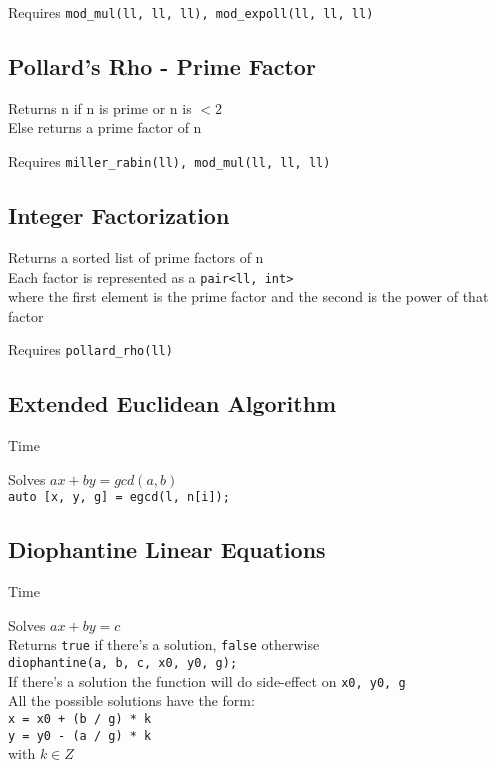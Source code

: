 Requires \verb|mod_mul(ll, ll, ll), mod_expoll(ll, ll, ll)|


\subsection{Pollard's Rho - Prime Factor}
Returns n if n is prime or n is $< 2$ \\
Else returns a prime factor of n

Requires \verb|miller_rabin(ll), mod_mul(ll, ll, ll)|


\subsection{Integer Factorization}
Returns a sorted list of prime factors of n \\
Each factor is represented as a \verb|pair<ll, int>| \\
where the first element is the prime factor and the second is the power of that factor

Requires \verb|pollard_rho(ll)|


\subsection{Extended Euclidean Algorithm}
 Time

Solves $ax + by = gcd(a, b)$ \\
\verb|auto [x, y, g] = egcd(l, n[i]);|


\subsection{Diophantine Linear Equations}
 Time

Solves $ax + by = c$ \\
Returns \verb|true| if there's a solution, \verb|false| otherwise \\
\verb|diophantine(a, b, c, x0, y0, g);| \\
If there's a solution the function will do side-effect on \verb|x0, y0, g|\\
All the possible solutions have the form: \\
\verb|x = x0 + (b / g) * k| \\
\verb|y = y0 - (a / g) * k| \\
with $k \in Z$

